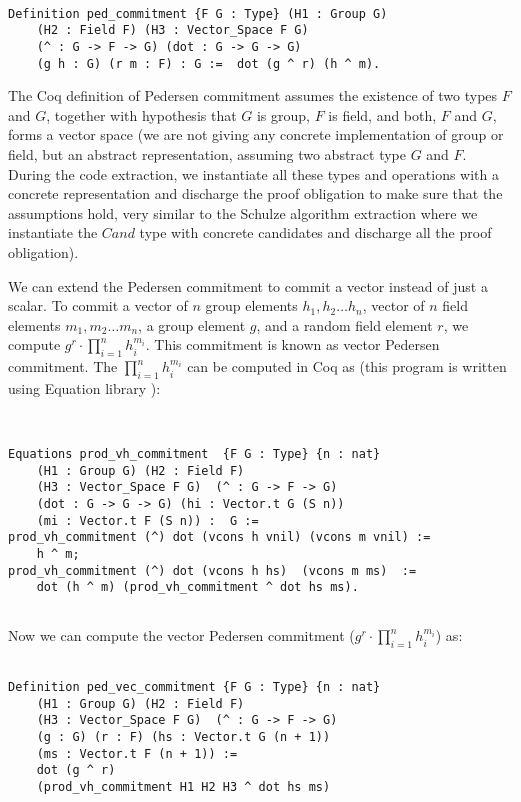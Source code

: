 \begin{verbatim}

Definition ped_commitment {F G : Type} (H1 : Group G) 
	(H2 : Field F) (H3 : Vector_Space F G) 
	(^ : G -> F -> G) (dot : G -> G -> G) 
	(g h : G) (r m : F) : G :=  dot (g ^ r) (h ^ m).

\end{verbatim}

\noindent
The Coq definition of Pedersen commitment assumes the existence of two types
$F$ and $G$, together with hypothesis that $G$ is group, $F$ is field, and  
both, $F$ and $G$, forms a vector space (we are not giving any concrete implementation of group or field, 
but an abstract representation, assuming two abstract type $G$ and $F$.  During the code extraction,  we instantiate all 
these types and operations with a concrete representation and discharge the proof 
obligation to make sure that the assumptions hold, very similar to the Schulze algorithm 
extraction where we instantiate the $Cand$ type with concrete candidates 
and discharge all the proof obligation).


We can extend the Pedersen commitment to commit a vector instead of 
just a scalar.  To commit a
vector of $n$ group elements $h_{1}, h_{2} \dots h_{n}$, vector of $n$ 
field elements $m_{1}, m_{2} \dots m_{n}$,  a group element $g$,  and a random field element 
$r$,  we compute  $g^r \cdot \prod_{i = 1}^n  h_{i}^{m_{i}}$.  This commitment is 
known as vector Pedersen commitment.  
The $\prod_{i = 1}^n  h_{i}^{m_{i}}$ can be computed in Coq as 
(this program is written using Equation library \citep{Sozeau:2019:ERH:3352468.3341690}):

\begin{verbatim}


Equations prod_vh_commitment  {F G : Type} {n : nat} 
	(H1 : Group G) (H2 : Field F)
	(H3 : Vector_Space F G)  (^ : G -> F -> G) 
	(dot : G -> G -> G) (hi : Vector.t G (S n)) 
	(mi : Vector.t F (S n)) :  G :=
prod_vh_commitment (^) dot (vcons h vnil) (vcons m vnil) := 
	h ^ m;
prod_vh_commitment (^) dot (vcons h hs)  (vcons m ms)  := 
	dot (h ^ m) (prod_vh_commitment ^ dot hs ms).


\end{verbatim}

\noindent
Now we can compute the vector Pedersen commitment ($g^r \cdot  \prod_{i = 1}^n  h_{i}^{m_{i}}$) as:

\begin{verbatim}

Definition ped_vec_commitment {F G : Type} {n : nat} 
	(H1 : Group G) (H2 : Field F)
	(H3 : Vector_Space F G)  (^ : G -> F -> G)
	(g : G) (r : F) (hs : Vector.t G (n + 1))
	(ms : Vector.t F (n + 1)) := 
	dot (g ^ r) 
	(prod_vh_commitment H1 H2 H3 ^ dot hs ms)  
\end{verbatim}
  
